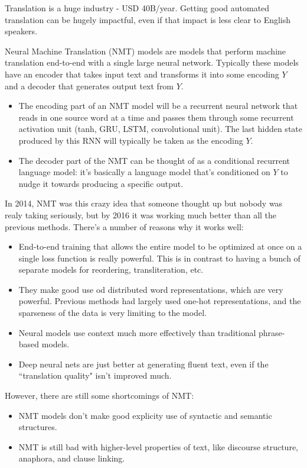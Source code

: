 Translation is a huge industry - USD 40B/year. Getting good automated translation can be hugely impactful, even if that impact is less clear to English speakers.

Neural Machine Translation (NMT) models are models that perform machine translation end-to-end with a single large neural network. Typically these models have an encoder that takes input text and transforms it into some encoding $Y$ and a decoder that generates output text from $Y$. 

\begin{itemize}
\item The encoding part of an NMT model will be a recurrent neural network that reads in one source word at a time and passes them through some recurrent activation unit (tanh, GRU, LSTM, convolutional unit). The last hidden state produced by this RNN will typically be taken as the encoding $Y$. 
\item The decoder part of the NMT can be thought of as a conditional recurrent language model: it's basically a language model that's conditioned on $Y$ to nudge it towards producing a specific output.
\end{itemize}

In 2014, NMT was this crazy idea that someone thought up but nobody was realy taking seriously, but by 2016 it was working much better than all the previous methods. There's a number of reasons why it works well:
\begin{itemize}
\item End-to-end training that allows the entire model to be optimized at once on a single loss function is really powerful. This is in contrast to having a bunch of separate models for reordering, transliteration, etc.
\item They make good use od distributed word representations, which are very powerful. Previous methods had largely used one-hot representations, and the sparseness of the data is very limiting to the model.
\item Neural models use context much more effectively than traditional phrase-based models.
\item Deep neural nets are just better at generating fluent text, even if the ``translation quality" isn't improved much.
\end{itemize}
However, there are still some shortcomings of NMT:
\begin{itemize}
\item NMT models don't make good explicity use of syntactic and semantic structures.
\item NMT is still bad with higher-level properties of text, like discourse structure, anaphora, and clause linking.
\end{itemize}

